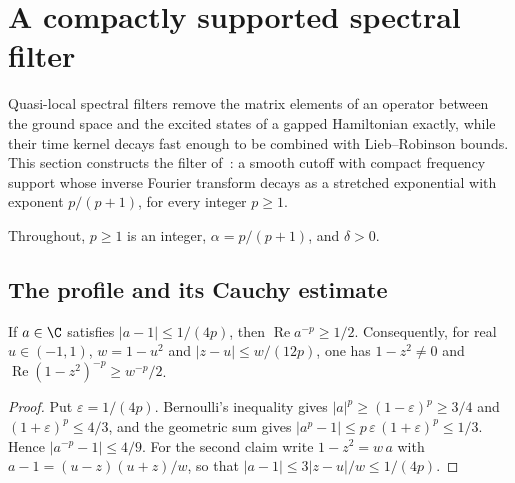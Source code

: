 
\section{A compactly supported spectral filter}
\label{ch:spectral_filter}

Quasi-local spectral filters remove the matrix elements of an operator
between the ground space and the excited states of a gapped Hamiltonian
exactly, while their time kernel decays fast enough to be combined with
Lieb--Robinson bounds. This section constructs the filter
of~\cite[Lemma~4.2]{OpenAI2026AreaLaw}: a smooth cutoff with compact
frequency support whose inverse Fourier transform decays as a stretched
exponential with exponent $p/(p+1)$, for every integer $p\ge1$.

Throughout, $p\ge1$ is an integer, $\alpha=p/(p+1)$, and $\delta>0$.

\subsection{The profile and its Cauchy estimate}
\label{sec:spectral_filter_profile}

\begin{lemma}
    \label{lem:spectral_filter_re_bound}
    \leanok
    If $a\in\C$ satisfies $|a-1|\le 1/(4p)$, then
    $\operatorname{Re}a^{-p}\ge 1/2$. Consequently, for real
    $u\in(-1,1)$, $w=1-u^2$ and $|z-u|\le w/(12p)$, one has $1-z^2\ne0$
    and $\operatorname{Re}(1-z^2)^{-p}\ge w^{-p}/2$.
\end{lemma}
\begin{proof}\leanok
    Put $\varepsilon=1/(4p)$. Bernoulli's inequality gives
    $|a|^p\ge(1-\varepsilon)^p\ge 3/4$ and $(1+\varepsilon)^p\le 4/3$, and
    the geometric sum gives $|a^p-1|\le p\,\varepsilon\,(1+\varepsilon)^p\le1/3$.
    Hence $|a^{-p}-1|\le4/9$. For the second claim write
    $1-z^2=w\,a$ with $a-1=(u-z)(u+z)/w$, so that
    $|a-1|\le 3|z-u|/w\le1/(4p)$.
\end{proof}

